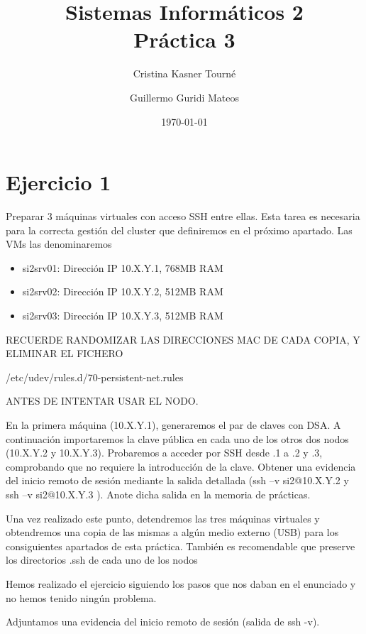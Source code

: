 \documentclass[a4paper, 10pt]{article}
\title{Sistemas Informáticos 2\\Práctica 3}
\author{Cristina Kasner Tourné\and Guillermo Guridi Mateos}
\date{\today}
\begin{document}


\section{Ejercicio 1}
\begin{mdframed}
	Preparar 3 máquinas virtuales con acceso SSH entre ellas. Esta tarea es necesaria para la
	correcta gestión del cluster que definiremos en el próximo apartado. Las VMs las denominaremos
	\begin{itemize}
		\item si2srv01: Dirección IP 10.X.Y.1, 768MB RAM
		\item si2srv02: Dirección IP 10.X.Y.2, 512MB RAM
		\item si2srv03: Dirección IP 10.X.Y.3, 512MB RAM 
	\end{itemize}
	
	RECUERDE RANDOMIZAR LAS DIRECCIONES MAC DE CADA COPIA, Y ELIMINAR EL FICHERO 
	
	/etc/udev/rules.d/70-persistent-net.rules 
	
	ANTES DE INTENTAR USAR EL NODO.
	
	
	En la primera máquina (10.X.Y.1), generaremos el par de claves con DSA. A continuación importaremos la
	clave pública en cada uno de los otros dos nodos (10.X.Y.2 y 10.X.Y.3). Probaremos a acceder por SSH
	desde .1 a .2 y .3, comprobando que no requiere la introducción de la clave. Obtener una evidencia del
	inicio remoto de sesión mediante la salida detallada (ssh –v si2@10.X.Y.2 y ssh –v si2@10.X.Y.3 ). Anote
	dicha salida en la memoria de prácticas.
	
	
	Una vez realizado este punto, detendremos las tres máquinas virtuales y obtendremos una copia de
	las mismas a algún medio externo (USB) para los consiguientes apartados de esta práctica.
	También es recomendable que preserve los directorios .ssh de cada uno de los nodos
\end{mdframed}




Hemos realizado el ejercicio siguiendo los pasos que nos daban en el enunciado y no hemos tenido ningún problema.

Adjuntamos una evidencia del inicio remoto de sesión (salida de ssh -v).
\end{document}
